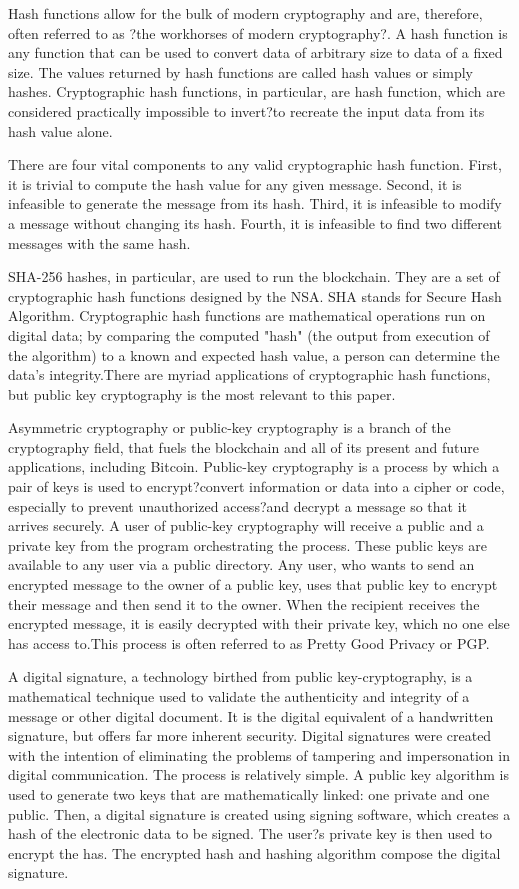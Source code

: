\documentclass[11pt, oneside]{article}   	%
\begin{document}
		\par
	Hash functions allow for the bulk of modern cryptography and are, therefore, often referred to as ?the workhorses of modern cryptography?. A hash function is any function that can be used to convert data of arbitrary size to data of a fixed size. The values returned by hash functions are called hash values or simply hashes. Cryptographic hash functions, in particular, are hash function, which are considered practically impossible to invert?to recreate the input data from its hash value alone. 
		\par
	There are four vital components to any valid cryptographic hash function. First, it is trivial to compute the hash value for any given message. Second, it is infeasible to generate the message from its hash. Third, it is infeasible to modify a message without changing its hash. Fourth, it is infeasible to find two different messages with the same hash. 
		\par
	SHA-256 hashes, in particular, are used to run the blockchain. They are a set of cryptographic hash functions designed by the NSA. SHA stands for Secure Hash Algorithm. Cryptographic hash functions are mathematical operations run on digital data; by comparing the computed "hash" (the output from execution of the algorithm) to a known and expected hash value, a person can determine the data's integrity.There are myriad applications of cryptographic hash functions, but public key cryptography is the most relevant to this paper.
		\par
	Asymmetric cryptography or public-key cryptography is a branch of the cryptography field, that fuels the blockchain and all of its present and future applications, including Bitcoin. Public-key cryptography is a process by which a pair of keys is used to encrypt?convert information or data into a cipher or code, especially to prevent unauthorized access?and decrypt a message so that it arrives securely. A user of public-key cryptography will receive a public and a private key from the program orchestrating the process. These public keys are available to any user via a public directory. Any user, who wants to send an encrypted message to the owner of a public key, uses that public key to encrypt their message and then send it to the owner. When the recipient receives the encrypted message, it is easily decrypted with their private key, which no one else has access to.This process is often referred to as Pretty Good Privacy or PGP. 
		\par
	A digital signature, a technology birthed from public key-cryptography, is a mathematical technique used to validate the authenticity and integrity of a message or other digital document. It is the digital equivalent of a handwritten signature, but offers far more inherent security. Digital signatures were created with the intention of eliminating the problems of tampering and impersonation in digital communication. The process is relatively simple. A public key algorithm is used to generate two keys that are mathematically linked: one private and one public. Then, a digital signature is created using signing software, which creates a hash of the electronic data to be signed. The user?s private key is then used to encrypt the has. The encrypted hash and hashing algorithm compose the digital signature. 
\end{document}
